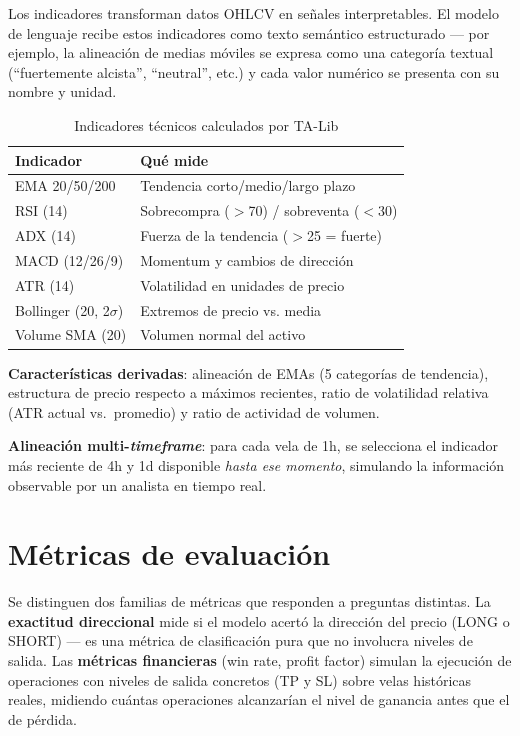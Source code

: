 \documentclass[10pt,twocolumn]{article}
\begin{document}
Los indicadores transforman datos OHLCV en se\~nales interpretables. El modelo de lenguaje recibe estos indicadores como texto sem\'antico estructurado --- por ejemplo, la alineaci\'on de medias m\'oviles se expresa como una categor\'ia textual (``fuertemente alcista'', ``neutral'', etc.) y cada valor num\'erico se presenta con su nombre y unidad.

\begin{table}[H]
\centering
\caption{Indicadores t\'ecnicos calculados por TA-Lib}
\label{tab:indicators}
\footnotesize
\begin{tabularx}{\columnwidth}{lX}
\toprule
\textbf{Indicador} & \textbf{Qu\'e mide} \\
\midrule
EMA 20/50/200 & Tendencia corto/medio/largo plazo \\
RSI (14) & Sobrecompra ($>$70) / sobreventa ($<$30) \\
ADX (14) & Fuerza de la tendencia ($>$25 = fuerte) \\
MACD (12/26/9) & Momentum y cambios de direcci\'on \\
ATR (14) & Volatilidad en unidades de precio \\
Bollinger (20, 2$\sigma$) & Extremos de precio vs. media \\
Volume SMA (20) & Volumen normal del activo \\
\bottomrule
\end{tabularx}
\end{table}

\textbf{Caracter\'isticas derivadas}: alineaci\'on de EMAs (5 categor\'ias de tendencia), estructura de precio respecto a m\'aximos recientes, ratio de volatilidad relativa (ATR actual vs.\ promedio) y ratio de actividad de volumen.

\textbf{Alineaci\'on multi-\textit{timeframe}}: para cada vela de 1h, se selecciona el indicador m\'as reciente de 4h y 1d disponible \textit{hasta ese momento}, simulando la informaci\'on observable por un analista en tiempo real.

\section{M\'etricas de evaluaci\'on}
\label{sec:metrics}

Se distinguen dos familias de m\'etricas que responden a preguntas distintas. La \textbf{exactitud direccional} mide si el modelo acert\'o la direcci\'on del precio (LONG o SHORT) --- es una m\'etrica de clasificaci\'on pura que no involucra niveles de salida. Las \textbf{m\'etricas financieras} (win rate, profit factor) simulan la ejecuci\'on de operaciones con niveles de salida concretos (TP y SL) sobre velas hist\'oricas reales, midiendo cu\'antas operaciones alcanzar\'ian el nivel de ganancia antes que el de p\'erdida.
\end{document}
